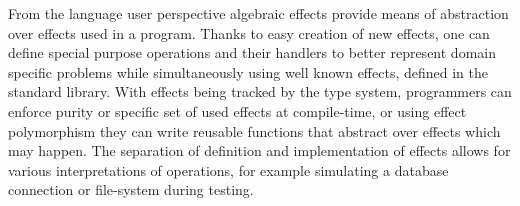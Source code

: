 \documentclass[inz, english, shortabstract]{iithesis}
\begin{document}
From the language user perspective algebraic effects provide means of abstraction over effects used in a program.
Thanks to easy creation of new effects, one can define special purpose operations and their handlers to better represent domain specific problems while simultaneously using well known effects, defined in the standard library.
With effects being tracked by the type system, programmers can enforce purity or specific set of used effects at compile-time, or using effect polymorphism they can write reusable functions that abstract over effects which may happen.
The separation of definition and implementation of effects allows for various interpretations of operations, for example simulating a database connection or file-system during testing.
\end{document}
